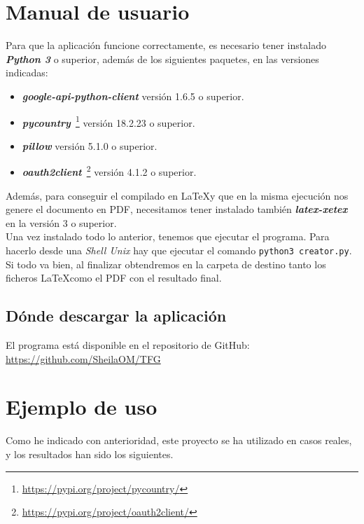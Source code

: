 \documentclass[a4paper, 12pt]{book}
\begin{document}

\cleardoublepage
\appendix
\chapter{Manual de usuario}
\label{app:manual}
Para que la aplicación funcione correctamente, es necesario tener instalado \textbf{\textit{Python 3}} o superior, además de los siguientes paquetes, en las versiones indicadas:
\begin{itemize}
	\item \textbf{\textit{google-api-python-client}}\cite{google_api_client:1} versión 1.6.5 o superior.
	\item \textbf{\textit{pycountry}}~\footnote{\url{https://pypi.org/project/pycountry/}} versión 18.2.23 o superior.
	\item \textbf{\textit{pillow}}\cite{pillow:1} versión 5.1.0 o superior.
	\item \textbf{\textit{oauth2client}}~\footnote{\url{https://pypi.org/project/oauth2client/}} versión 4.1.2 o superior.
\end{itemize}

Además, para conseguir el compilado en \LaTeX y que en la misma ejecución nos genere el documento en PDF, necesitamos tener instalado también \textbf{\textit{latex-xetex}} en la versión 3 o superior.\\

Una vez instalado todo lo anterior, tenemos que ejecutar el programa. Para hacerlo desde una \textit{Shell Unix} hay que ejecutar el comando \texttt{python3 creator.py}. Si todo va bien, al finalizar obtendremos en la carpeta de destino tanto los ficheros \LaTeX como el PDF con el resultado final.

\section{Dónde descargar la aplicación}
\label{sec:descarga_aplicacion}
El programa está disponible en el repositorio de GitHub:\\
\url{https://github.com/SheilaOM/TFG}


\cleardoublepage
\chapter{Ejemplo de uso}
\label{app:ejemplos}
Como he indicado con anterioridad, este proyecto se ha utilizado en casos reales, y los resultados han sido los siguientes.
\end{document}
